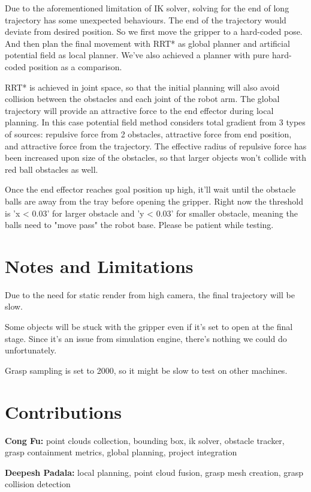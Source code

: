 \documentclass[
	english,
	accentcolor=11d,%
	type=intern,
	marginpar=false,
    logofile=media/PEARLTUDA.png
	]{tudapub}
\begin{document}
Due to the aforementioned limitation of IK solver, solving for the end of long trajectory has some unexpected behaviours. The end of the trajectory would deviate from desired position. So we first move the gripper to a hard-coded pose. And then plan the final movement with RRT* as global planner and artificial potential field as local planner. We've also achieved a planner with pure hard-coded position as a comparison.

RRT* is achieved in joint space, so that the initial planning will also avoid collision between the obstacles and each joint of the robot arm. The global trajectory will provide an attractive force to the end effector during local planning. In this case potential field method considers total gradient from 3 types of sources: repulsive force from 2 obstacles, attractive force from end position, and attractive force from the trajectory. The effective radius of repulsive force has been increased upon size of the obstacles, so that larger objects won't collide with red ball obstacles as well.

Once the end effector reaches goal position up high, it'll wait until the obstacle balls are away from the tray before opening the gripper. Right now the threshold is 'x < 0.03' for larger obstacle and 'y < 0.03' for smaller obstacle, meaning the balls need to "move pass" the robot base. Please be patient while testing. 

\section{Notes and Limitations}

Due to the need for static render from high camera, the final trajectory will be slow. 

Some objects will be stuck with the gripper even if it's set to open at the final stage. Since it's an issue from simulation engine, there's nothing we could do unfortunately.

Grasp sampling is set to 2000, so it might be slow to test on other machines.

\section{Contributions}

\noindent\textbf{Cong Fu:} point clouds collection, bounding box, ik solver, obstacle tracker, grasp containment metrics, global planning, project integration

\noindent\textbf{Deepesh Padala:} local planning, point cloud fusion, grasp mesh creation, grasp collision detection
\end{document}
